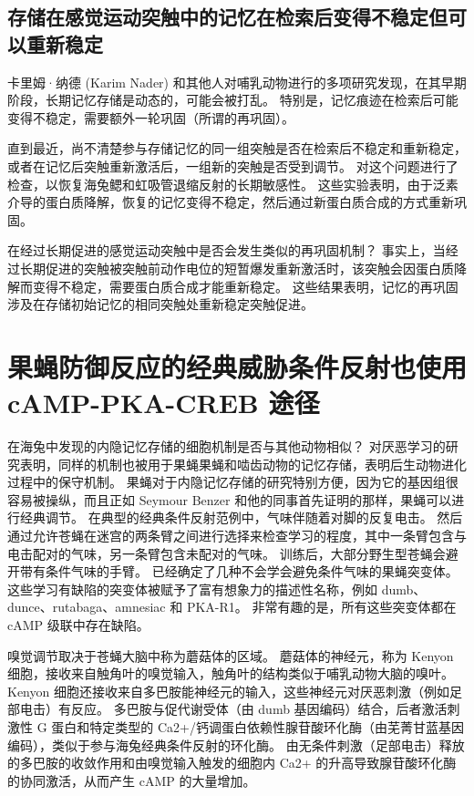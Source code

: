 \subsection{存储在感觉运动突触中的记忆在检索后变得不稳定但可以重新稳定}
卡里姆·纳德 (Karim Nader) 和其他人对哺乳动物进行的多项研究发现，在其早期阶段，长期记忆存储是动态的，可能会被打乱。 特别是，记忆痕迹在检索后可能变得不稳定，需要额外一轮巩固（所谓的再巩固）。

直到最近，尚不清楚参与存储记忆的同一组突触是否在检索后不稳定和重新稳定，或者在记忆后突触重新激活后，一组新的突触是否受到调节。 对这个问题进行了检查，以恢复海兔鳃和虹吸管退缩反射的长期敏感性。 这些实验表明，由于泛素介导的蛋白质降解，恢复的记忆变得不稳定，然后通过新蛋白质合成的方式重新巩固。

在经过长期促进的感觉运动突触中是否会发生类似的再巩固机制？ 事实上，当经过长期促进的突触被突触前动作电位的短暂爆发重新激活时，该突触会因蛋白质降解而变得不稳定，需要蛋白质合成才能重新稳定。 这些结果表明，记忆的再巩固涉及在存储初始记忆的相同突触处重新稳定突触促进。


\section{果蝇防御反应的经典威胁条件反射也使用 cAMP-PKA-CREB 途径}
在海兔中发现的内隐记忆存储的细胞机制是否与其他动物相似？ 对厌恶学习的研究表明，同样的机制也被用于果蝇果蝇和啮齿动物的记忆存储，表明后生动物进化过程中的保守机制。 果蝇对于内隐记忆存储的研究特别方便，因为它的基因组很容易被操纵，而且正如 Seymour Benzer 和他的同事首先证明的那样，果蝇可以进行经典调节。 在典型的经典条件反射范例中，气味伴随着对脚的反复电击。 然后通过允许苍蝇在迷宫的两条臂之间进行选择来检查学习的程度，其中一条臂包含与电击配对的气味，另一条臂包含未配对的气味。 训练后，大部分野生型苍蝇会避开带有条件气味的手臂。 已经确定了几种不会学会避免条件气味的果蝇突变体。 这些学习有缺陷的突变体被赋予了富有想象力的描述性名称，例如 dumb、dunce、rutabaga、amnesiac 和 PKA-R1。 非常有趣的是，所有这些突变体都在 cAMP 级联中存在缺陷。

嗅觉调节取决于苍蝇大脑中称为蘑菇体的区域。 蘑菇体的神经元，称为 Kenyon 细胞，接收来自触角叶的嗅觉输入，触角叶的结构类似于哺乳动物大脑的嗅叶。 Kenyon 细胞还接收来自多巴胺能神经元的输入，这些神经元对厌恶刺激（例如足部电击）有反应。 多巴胺与促代谢受体（由 dumb 基因编码）结合，后者激活刺激性 G 蛋白和特定类型的 Ca2+/钙调蛋白依赖性腺苷酸环化酶（由芜菁甘蓝基因编码），类似于参与海兔经典条件反射的环化酶。 由无条件刺激（足部电击）释放的多巴胺的收敛作用和由嗅觉输入触发的细胞内 Ca2+ 的升高导致腺苷酸环化酶的协同激活，从而产生 cAMP 的大量增加。

